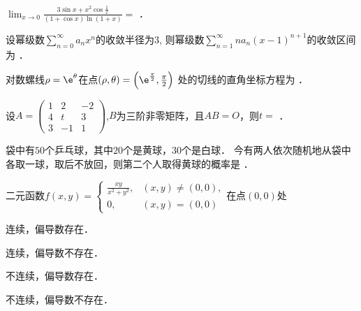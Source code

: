 \documentclass[plain,noanswer,medmath]{../../template/jnuexam}
\begin{document}




\begin{problem}
$\lim_{x \to 0} \frac{3\sin x + x^2\cos \frac{1}{x}}{(1 + \cos x)\ln(1 + x)} =$ \fillin{}．
\end{problem}


\begin{problem}
设幂级数$\sum_{n = 0}^{\infty}a_n x^n$的收敛半径为$3$,
则幂级数$\sum_{n = 1}^{\infty}na_n (x - 1)^{n + 1}$的收敛区间为 \fillin{}．
\end{problem}


\begin{problem}
对数螺线$\rho = \e^{\theta}$在点$(\rho ,\theta) = \left(\e^{\frac{\pi}{2}},\tfrac{\pi}{2} \right)$
处的切线的直角坐标方程为 \fillin{}．
\end{problem}


\begin{problem}
设$A = \begin{pmatrix}
  1 &  2 & -2 \\
  4 &  t & 3 \\
  3 & -1 & 1
\end{pmatrix}$,$B$为三阶非零矩阵，且$AB = O$，则$t =$ \fillin{}．
\end{problem}


\begin{problem}
袋中有$50$个乒乓球，其中$20$个是黄球，$30$个是白球．
今有两人依次随机地从袋中各取一球，取后不放回，则第二个人取得黄球的概率是 \fillin{}．
\end{problem}




\begin{problem}
二元函数$f(x,y) = \begin{cases}
 \frac{xy}{x^2 + y^2}, & (x,y) \ne(0,0), \\
 0, & (x,y) = (0,0)
\end{cases}$在点$(0,0)$处\pickout{}
\begin{abcd}
\item 连续，偏导数存在．                
\item 连续，偏导数不存在．
\item 不连续，偏导数存在．              
\item 不连续，偏导数不存在．
\end{abcd}
\end{problem}
\end{document}

